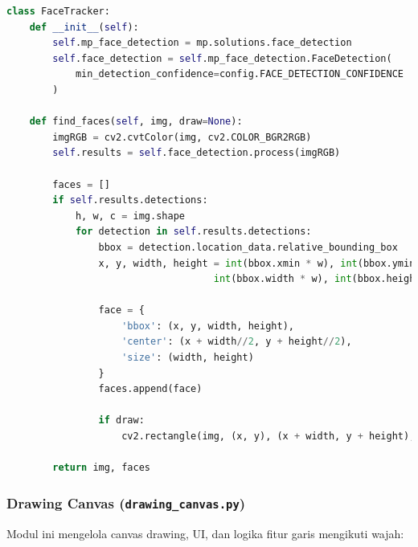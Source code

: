 \documentclass[11pt,a4paper]{article}
\begin{document}
\begin{lstlisting}[language=Python, caption=Implementasi face tracking]
class FaceTracker:
    def __init__(self):
        self.mp_face_detection = mp.solutions.face_detection
        self.face_detection = self.mp_face_detection.FaceDetection(
            min_detection_confidence=config.FACE_DETECTION_CONFIDENCE
        )
    
    def find_faces(self, img, draw=None):
        imgRGB = cv2.cvtColor(img, cv2.COLOR_BGR2RGB)
        self.results = self.face_detection.process(imgRGB)
        
        faces = []
        if self.results.detections:
            h, w, c = img.shape
            for detection in self.results.detections:
                bbox = detection.location_data.relative_bounding_box
                x, y, width, height = int(bbox.xmin * w), int(bbox.ymin * h), \
                                    int(bbox.width * w), int(bbox.height * h)
                
                face = {
                    'bbox': (x, y, width, height),
                    'center': (x + width//2, y + height//2),
                    'size': (width, height)
                }
                faces.append(face)
                
                if draw:
                    cv2.rectangle(img, (x, y), (x + width, y + height), (0, 255, 0), 2)
        
        return img, faces
\end{lstlisting}

\subsubsection{Drawing Canvas (\texttt{drawing\_canvas.py})}
Modul ini mengelola canvas drawing, UI, dan logika fitur garis mengikuti wajah:
\end{document}
